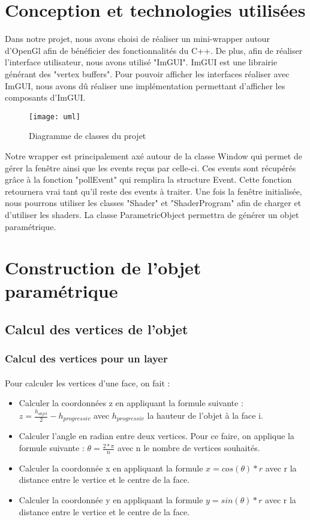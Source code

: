 \documentclass[article, backcover, french, nodocumentinfo]{upmethodology-document}
\begin{document}
	\section{Conception et technologies utilisées}
		Dans notre projet, nous avons choisi de réaliser un mini-wrapper autour d'OpenGl afin de bénéficier des fonctionnalités du C++.
		De plus, afin de réaliser l'interface utilisateur, nous avons utilisé "ImGUI". ImGUI est une librairie générant des "vertex buffers".
		Pour pouvoir afficher les interfaces réaliser avec ImGUI, nous avons dû réaliser une implémentation permettant d'afficher les composants d'ImGUI.

		\begin{figure}[H]
			\centering%
			\texttt{[image: uml]}
			\caption{Diagramme de classes du projet}
			\label{fig:uml}
		\end{figure}

		Notre wrapper est principalement axé autour de la classe Window qui permet de gérer la fenêtre ainsi que les events reçus par celle-ci.
		Ces events sont récupérés grâce à la fonction "pollEvent" qui remplira la structure Event. Cette fonction retournera vrai tant qu'il reste des events à traiter.
		Une fois la fenêtre initialisée, nous pourrons utiliser les classes "Shader" et "ShaderProgram" afin de charger et d'utiliser les shaders.
		La classe ParametricObject permettra de générer un objet paramétrique.
		
	\section{Construction de l'objet paramétrique}
	\subsection{Calcul des vertices de l'objet}
	\subsubsection{Calcul des vertices pour un layer}\label{a}
		\paragraph{} Pour calculer les vertices d'une face, on fait : 
		\begin{itemize}
			\item Calculer la coordonnées z en appliquant la formule suivante : $z = \frac{h_{objet}}{2} - h_{progressiv}$ avec $h_{progressiv}$ la hauteur de l'objet à la face i.
			\item Calculer l'angle en radian entre deux vertices. Pour ce faire, on applique la formule suivante : $\theta = \frac{2*\pi}{n}$ avec n le nombre de vertices souhaités.
			\item Calculer la coordonnée x en appliquant la formule $x = cos(\theta)*r$ avec r la distance entre le vertice et le centre de la face.
			\item Calculer la coordonnée y en appliquant la formule $y = sin(\theta)*r$ avec r la distance entre le vertice et le centre de la face.
		\end{itemize}
\end{document}
